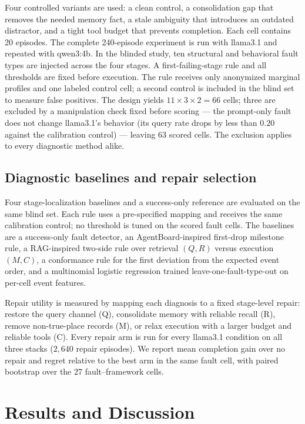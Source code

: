 \documentclass{article}
\begin{document}
Four controlled variants are used: a clean control, a consolidation gap that removes the needed memory fact, a stale ambiguity that introduces an outdated distractor, and a tight tool budget that prevents completion. Each cell contains 20 episodes. The complete 240-episode experiment is run with llama3.1 and repeated with qwen3:4b. In the blinded study, ten structural and behavioral fault types are injected across the four stages. A first-failing-stage rule and all thresholds are fixed before execution. The rule receives only anonymized marginal profiles and one labeled control cell; a second control is included in the blind set to measure false positives. The design yields $11\times3\times2=66$ cells; three are excluded by a manipulation check fixed before scoring --- the prompt-only fault does not change llama3.1's behavior (its query rate drops by less than $0.20$ against the calibration control) --- leaving 63 scored cells. The exclusion applies to every diagnostic method alike.

\subsection{Diagnostic baselines and repair selection}
\label{sec:baselines-method}

Four stage-localization baselines and a success-only reference are
evaluated on the same blind set. Each rule uses a pre-specified
mapping and receives the same calibration control; no threshold is
tuned on the scored fault cells. The baselines are a success-only
fault detector, an AgentBoard-inspired first-drop milestone rule, a
RAG-inspired two-side rule over retrieval $(Q,R)$ versus execution
$(M,C)$, a conformance rule for the first deviation from the expected
event order, and a multinomial logistic regression trained
leave-one-fault-type-out on per-cell event features.

Repair utility is measured by mapping each diagnosis to a fixed
stage-level repair: restore the query channel (Q), consolidate memory
with reliable recall (R), remove non-true-place records (M), or relax
execution with a larger budget and reliable tools (C). Every repair
arm is run for every llama3.1 condition on all three stacks
($2{,}640$ repair episodes). We report mean completion gain over no
repair and regret relative to the best arm in the same fault cell,
with paired bootstrap over the 27 fault--framework cells.

\section{Results and Discussion}
\label{sec:results}
\end{document}
